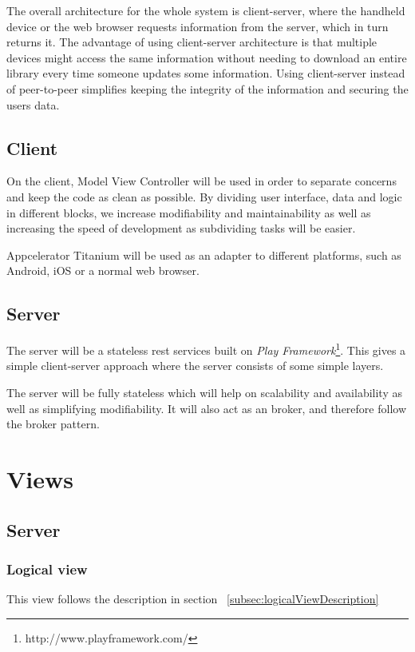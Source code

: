 \documentclass[11pt]{book}
\begin{document}
The overall architecture for the whole system is client-server, where the handheld device or the web browser requests information from the server, which in turn returns it. The advantage of using client-server architecture is that multiple devices might access the same information without needing to download an entire library every time someone updates some information. Using client-server instead of peer-to-peer simplifies keeping the integrity of the information and securing the users data.

\subsection{Client}
On the client, Model View Controller will be used in order to separate concerns and keep the code as clean as possible. By dividing user interface, data and logic in different blocks, we increase modifiability and maintainability as well as increasing the speed of development as subdividing tasks will be easier.

Appcelerator Titanium will be used as an adapter to different platforms, such as Android, iOS or a normal web browser.

\subsection{Server}
The server will be a stateless \gls{rest} services built on \emph{Play Framework}\footnote{http://www.playframework.com/}. This gives a simple client-server approach where the server consists of some simple layers.

The server will be fully stateless which will help on scalability and availability as well as simplifying modifiability. It will also act as an broker, and therefore follow the broker pattern.

\section{Views}

\subsection{Server}

\subsubsection{Logical view}
This view follows the description in section ~\ref{subsec:logicalViewDescription}
\end{document}
